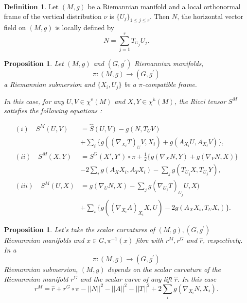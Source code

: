 \documentclass{birkjour}
\newtheorem{proposition}[theorem]{Proposition}
\theoremstyle{definition}
\newtheorem{definition}[theorem]{Definition}
\theoremstyle{remark}
\numberwithin{equation}{section}
\begin{document}
\begin{definition}\rm\cite{FIP}
	Let $(M, g)$ be a Riemannian manifold and a local orthonormal frame of the vertical distribution $\nu$ is $\{U_j\}_{1\leq j\leq r} $.
	Then $N$, the horizontal vector field on $(M, g)$ is locally defined by
	$$N = \sum_{j=1}^{r}  T_{U_j}U_j.$$
\end{definition}
\begin{proposition}\label{pro1}
	Let  $(M, g)$ and $(G, g^\prime)$ Riemannian manifolds,
	$$\pi: (M, g)\to (G, g^\prime) $$
	a Riemannian submersion
	and $\{X_i, U_j\}$ be  a $\pi$-compatible frame.
	
	In this case, for any $U, V \in \chi^v (M)$ and $X, Y \in  \chi^h (M)$, the Ricci tensor $S^M$ satisfies the following equations \cite{FIP}:
	
	\begin{align}\label{S1}
	(i) \,\,\,\,\,\,  S^M(U,V) &= \hat{S}(U,V) -g(N,T_U V) \\
	&+ \sum_{i} \{g((\nabla_{X_i}T)_U V,X_i)+g(A_{X_i}U, A_{X_i}V)\}, \nonumber\\
	(ii) \,\,\,\,\,\, S^M(X,Y) &=S^G (X', Y') \circ \pi + \frac{1}{2}
	\{g(\nabla_X N,Y)+g(\nabla_Y N, X) \} \label{S2}\\
	&-2 \sum_{i} g(A_X X_i, A_Y X_i) - \sum_{j} g(T_{U_j}X,T_{U_j}Y),\nonumber\\
	(iii) \,\,\,\,\,\, S^M(U,X) &= g(\nabla_U N,X) -\sum_{j} g(\nabla_{U_j}T)_{U_j}U,X) \label{S3} \\
	&+ \sum_{i} \{g((\nabla_{X_i}A)_{X_i} X,U)-2g(A_X {X_i}, T_U X_i)\}. \nonumber
	\end{align}
\end{proposition}

\begin{proposition}\label{pro2} \cite{FIP}
	Let's take the scalar curvatures of $(M, g), (G, g^\prime)$ Riemannian manifolds and $x \in G, \pi^{-1} (x)$ fibre with $r^M, r^G$ and $\hat{r}$, respectively.
	In a
	$$\pi: (M, g) \to (G, g^\prime)$$
	Riemannian submersion, $(M, g)$ depends on the scalar curvature of the Riemannian manifold $r^G$ and the scalar curve of any lift $\hat{r}$. In this case
	\begin{equation}\label{Pro2}
	r^M= \hat{r}+r^G \circ \pi - ||N||^2-||A||^2- ||T||^2+ 2 \sum_{i} g(\nabla_{X_i} N, X_i).
	\end{equation}
\end{proposition}

\end{document}
